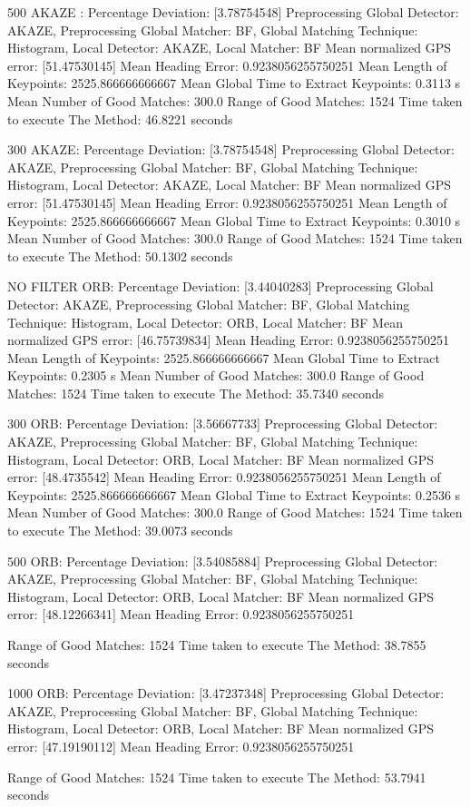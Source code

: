 500 AKAZE :
Percentage Deviation: [3.78754548] %
Preprocessing Global Detector: AKAZE, Preprocessing Global Matcher: BF, Global Matching Technique: Histogram, Local Detector: AKAZE, Local Matcher: BF
Mean normalized GPS error: [51.47530145]
 Mean Heading Error: 0.9238056255750251
Mean Length of Keypoints: 2525.866666666667
Mean Global Time to Extract Keypoints: 0.3113 s
Mean Number of Good Matches: 300.0
Range of Good Matches: 1524
Time taken to execute The Method: 46.8221 seconds


300 AKAZE:
Percentage Deviation: [3.78754548] %
Preprocessing Global Detector: AKAZE, Preprocessing Global Matcher: BF, Global Matching Technique: Histogram, Local Detector: AKAZE, Local Matcher: BF
Mean normalized GPS error: [51.47530145]
 Mean Heading Error: 0.9238056255750251
Mean Length of Keypoints: 2525.866666666667
Mean Global Time to Extract Keypoints: 0.3010 s
Mean Number of Good Matches: 300.0
Range of Good Matches: 1524
Time taken to execute The Method: 50.1302 seconds




NO FILTER ORB:
Percentage Deviation: [3.44040283] %
Preprocessing Global Detector: AKAZE, Preprocessing Global Matcher: BF, Global Matching Technique: Histogram, Local Detector: ORB, Local Matcher: BF
Mean normalized GPS error: [46.75739834]
 Mean Heading Error: 0.9238056255750251
Mean Length of Keypoints: 2525.866666666667
Mean Global Time to Extract Keypoints: 0.2305 s
Mean Number of Good Matches: 300.0
Range of Good Matches: 1524
Time taken to execute The Method: 35.7340 seconds

300 ORB:
Percentage Deviation: [3.56667733] %
Preprocessing Global Detector: AKAZE, Preprocessing Global Matcher: BF, Global Matching Technique: Histogram, Local Detector: ORB, Local Matcher: BF
Mean normalized GPS error: [48.4735542]
 Mean Heading Error: 0.9238056255750251
Mean Length of Keypoints: 2525.866666666667
Mean Global Time to Extract Keypoints: 0.2536 s
Mean Number of Good Matches: 300.0
Range of Good Matches: 1524
Time taken to execute The Method: 39.0073 seconds


500 ORB:
Percentage Deviation: [3.54085884] %
Preprocessing Global Detector: AKAZE, Preprocessing Global Matcher: BF, Global Matching Technique: Histogram, Local Detector: ORB, Local Matcher: BF
Mean normalized GPS error: [48.12266341]
 Mean Heading Error: 0.9238056255750251

Range of Good Matches: 1524
Time taken to execute The Method: 38.7855 seconds

1000 ORB:
Percentage Deviation: [3.47237348] %
Preprocessing Global Detector: AKAZE, Preprocessing Global Matcher: BF, Global Matching Technique: Histogram, Local Detector: ORB, Local Matcher: BF
Mean normalized GPS error: [47.19190112]
 Mean Heading Error: 0.9238056255750251

Range of Good Matches: 1524
Time taken to execute The Method: 53.7941 seconds